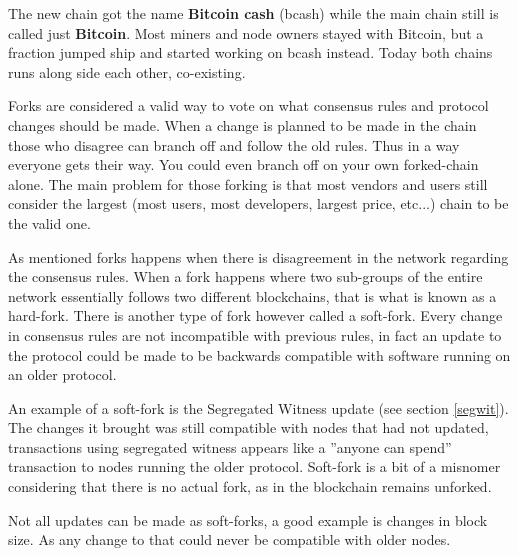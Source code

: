 The new chain got the name \textbf{Bitcoin cash} (bcash) while the main chain still is called just \textbf{Bitcoin}. Most miners and node owners stayed with Bitcoin, but a fraction jumped ship and started working on bcash instead. Today both chains runs along side each other, co-existing.\cite{selena_2017}

Forks are considered a valid way to vote on what consensus rules and protocol changes should be made. When a change is planned to be made in the chain those who disagree can branch off and follow the old rules. Thus in a way everyone gets their way. You could even branch off on your own forked-chain alone. The main problem for those forking is that most vendors and users still consider the largest (most users, most developers, largest price, etc...) chain to be the valid one. 

\label{soft_hard_fork}
As mentioned forks happens when there is disagreement in the network regarding the consensus rules. When a fork happens where two sub-groups of the entire network essentially follows two different blockchains, that is what is known as a hard-fork. There is another type of fork however called a soft-fork.  Every change in consensus rules are not incompatible with previous rules, in fact an update to the protocol could be made to be backwards compatible with software running on an older protocol.\cite{antonopoulos_2017}

An example of a soft-fork is the Segregated Witness update (see section \ref{segwit}). The changes it brought was still compatible with nodes that had not updated, transactions using segregated witness appears like a ''anyone can spend'' transaction to nodes running the older protocol. Soft-fork is a bit of a misnomer considering that there is no actual fork, as in the blockchain remains unforked.\cite{antonopoulos_2017}

Not all updates can be made as soft-forks, a good example is changes in block size. As any change to that could never be compatible with older nodes.